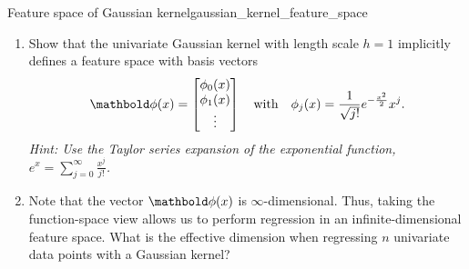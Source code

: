 \excheading

\begin{nexercise}{Feature space of Gaussian kernel}{gaussian_kernel_feature_space}
  \begin{enumerate}[label=\arabic*.]
    \item Show that the univariate Gaussian kernel with length scale $h = 1$ implicitly defines a feature space with basis vectors \begin{align*}
      \vphi(x) = \begin{bmatrix}\phi_0(x) \\ \phi_1(x) \\ \vdots\end{bmatrix} \quad\text{with}\quad \phi_j(x) = \frac{1}{\sqrt{j!}} e^{-\frac{x^2}{2}} x^j.
    \end{align*}
    \textit{Hint: Use the Taylor series expansion of the exponential function, ${e^x = \sum_{j=0}^\infty \frac{x^j}{j!}}$.}

    \item Note that the vector $\vphi(x)$ is $\infty$-dimensional.
    Thus, taking the function-space view allows us to perform regression in an infinite-dimensional feature space.
    What is the effective dimension when regressing $n$ univariate data points with a Gaussian kernel?
  \end{enumerate}\vspace{5pt}
\end{nexercise}

